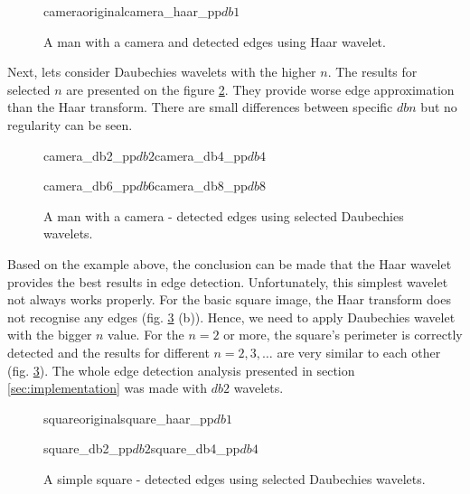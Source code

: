 \begin{figure}[h]
	\centering
	\begin{mainsubdiagrams2}{camera}{original}{camera_haar_pp}{$db1$}
	\end{mainsubdiagrams2}
	
	\caption{A man with a camera and detected edges using Haar wavelet.}
	\label{fig:camera_haar}
\end{figure}

Next, lets consider Daubechies wavelets with the higher $n$. The results for selected $n$ are presented on the figure \ref{fig:camera_daubechies}. They provide worse edge approximation than the Haar transform. There are small differences between specific $dbn$ but no regularity can be seen.

\begin{figure}[h]
	\centering
	\begin{mainsubdiagrams2}{camera_db2_pp}{$db2$}{camera_db4_pp}{$db4$}
	\end{mainsubdiagrams2}
	
	\begin{mainsubdiagrams2}{camera_db6_pp}{$db6$}{camera_db8_pp}{$db8$}
	\end{mainsubdiagrams2}
	
	\caption{A man with a camera - detected edges using selected Daubechies wavelets.}
	\label{fig:camera_daubechies}
\end{figure}

Based on the example above, the conclusion can be made that the Haar wavelet provides the best results in edge detection. Unfortunately, this simplest wavelet not always works properly. For the basic square image, the Haar transform does not recognise any edges (fig. \ref{fig:square_daubechies} (b)). Hence, we need to apply Daubechies wavelet with the bigger $n$ value. For the $n=2$ or more, the square's perimeter is correctly detected and the results for different $n=2,3,\ldots$ are very similar to each other (fig. \ref{fig:square_daubechies}). The whole edge detection analysis presented in section \ref{sec:implementation} was made with $db2$ wavelets.

\begin{figure}[h]
	\centering
	\begin{subdiagrams2}{square}{original}{square_haar_pp}{$db1$}
	\end{subdiagrams2}
	
	\begin{subdiagrams2}{square_db2_pp}{$db2$}{square_db4_pp}{$db4$}
	\end{subdiagrams2}
	
	\caption{A simple square - detected edges using selected Daubechies wavelets.}
	\label{fig:square_daubechies}
\end{figure}

